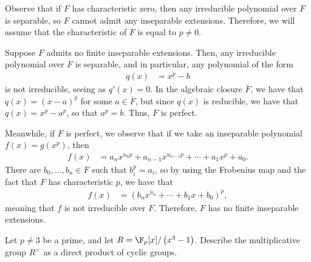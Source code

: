 \documentclass[10pt]{mypackage}
\begin{document}
\begin{solution}
  Observe that if $F$ has characteristic zero, then any irreducible polynomial over $F$ is separable, so $F$ cannot admit any inseparable extensions. Therefore, we will assume that the characteristic of $F$ is equal to $p\neq 0$.

  Suppose $F$ admits no finite inseparable extensions. Then, any irreducible polynomial over $F$ is separable, and in particular, any polynomial of the form
  \begin{align*}
    q(x) &= x^{p}-b
  \end{align*}
  is not irreducible, seeing as $q'(x) = 0$. In the algebraic closure $ \overline{F} $, we have that $q(x) = \left( x-a \right)^{p}$ for some $a\in \overline{F}$, but since $q(x)$ is reducible, we have that $q(x) = x^{p} - a^{p}$, so that $a^{p} = b$. Thus, $F$ is perfect.

  Meanwhile, if $F$ is perfect, we observe that if we take an inseparable polynomial $f(x) = g\left( x^{p} \right)$, then
  \begin{align*}
    f(x) &= a_n x^{u_n p} + a_{n-1}x^{u_{n-1}p} + \cdots + a_1 x^{p} + a_0.
  \end{align*}
  There are $b_0,\dots,b_n\in F$ such that $b_i^{p} = a_{i}$, so by using the Frobenius map and the fact that $F$ has characteristic $p$, we have that
  \begin{align*}
    f(x) &= \left( b_n x^{u_n} + \cdots + b_1 x + b_0 \right)^{p},
  \end{align*}
  meaning that $f$ is not irreducible over $F$. Therefore, $F$ has no finite inseparable extensions.
\end{solution}
\begin{problem}[Problem 8]
  Let $p\neq 3$ be a prime, and let $R = \F_p[x]/\left( x^3 - 1 \right)$. Describe the multiplicative group $R^{\times}$ as a direct product of cyclic groups.
\end{problem}
\end{document}
